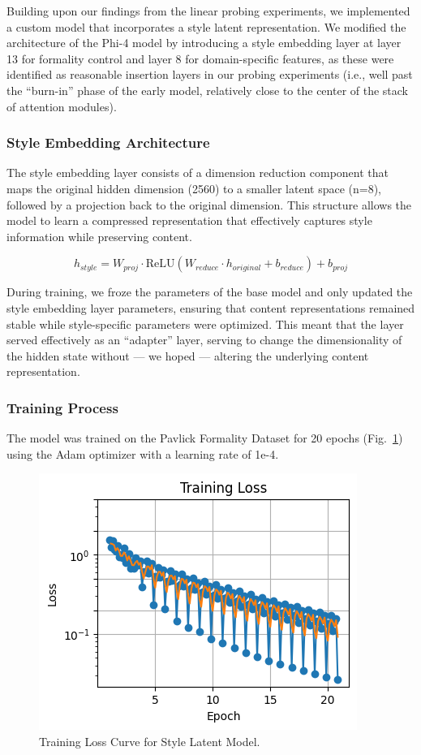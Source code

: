 \documentclass[twocolumn]{article}
\begin{document}
Building upon our findings from the linear probing experiments, we implemented a custom model that incorporates a style latent representation. We modified the architecture of the Phi-4 model by introducing a style embedding layer at layer 13 for formality control and layer 8 for domain-specific features, as these were identified as reasonable insertion layers in our probing experiments (i.e., well past the ``burn-in'' phase of the early model, relatively close to the center of the stack of attention modules).

\subsubsection{Style Embedding Architecture}
The style embedding layer consists of a dimension reduction component that maps the original hidden dimension (2560) to a smaller latent space (n=8), followed by a projection back to the original dimension. This structure allows the model to learn a compressed representation that effectively captures style information while preserving content.

\begin{equation}
h_{style} = W_{proj} \cdot \text{ReLU}(W_{reduce} \cdot h_{original} + b_{reduce}) + b_{proj}
\end{equation}

During training, we froze the parameters of the base model and only updated the style embedding layer parameters, ensuring that content representations remained stable while style-specific parameters were optimized.
This meant that the layer served effectively as an ``adapter'' layer, serving to change the dimensionality of the hidden state without --- we hoped --- altering the underlying content representation.

\subsubsection{Training Process}
The model was trained on the Pavlick Formality Dataset for 20 epochs (Fig.~\ref{fig:training-loss}) using the Adam optimizer with a learning rate of 1e-4.

\begin{figure}[H]
    \centering
    \includegraphics[width=0.5\linewidth]{figures/training-loss2.png}
    \caption{Training Loss Curve for Style Latent Model.}
    \label{fig:training-loss}
\end{figure}
\end{document}

